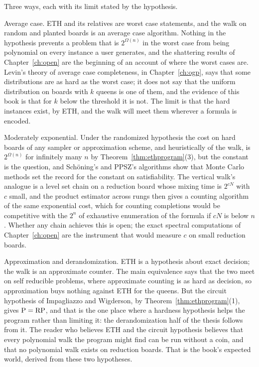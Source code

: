 Three ways, each with its limit stated by the hypothesis.

Average case. ETH and its relatives are worst case statements, and the walk on random and planted boards is an average case algorithm. Nothing in the hypothesis prevents a problem that is $2^{\Omega(n)}$ in the worst case from being polynomial on every instance a user generates, and the shattering results of Chapter~\ref{ch:open} are the beginning of an account of where the worst cases are. Levin's theory of average case completeness, in Chapter~\ref{ch:ogp}, says that some distributions are as hard as the worst case; it does not say that the uniform distribution on boards with $k$ queens is one of them, and the evidence of this book is that for $k$ below the threshold it is not. The limit is that the hard instances exist, by ETH, and the walk will meet them wherever a formula is encoded.

Moderately exponential. Under the randomized hypothesis the cost on hard boards of any sampler or approximation scheme, and heuristically of the walk, is $2^{\Omega(n)}$ for infinitely many $n$ by Theorem~\ref{thm:ethprogram}(3), but the constant is the question, and Sch\"oning's and PPSZ's algorithms show that Monte Carlo methods set the record for the constant on satisfiability. The vertical walk's analogue is a level set chain on a reduction board whose mixing time is $2^{cN}$ with $c$ small, and the product estimator across rungs then gives a counting algorithm of the same exponential cost, which for counting completions would be competitive with the $2^{n}$ of exhaustive enumeration of the formula if $c N$ is below $n$. Whether any chain achieves this is open; the exact spectral computations of Chapter~\ref{ch:open} are the instrument that would measure $c$ on small reduction boards.

Approximation and derandomization. ETH is a hypothesis about exact decision; the walk is an approximate counter. The main equivalence says that the two meet on self reducible problems, where approximate counting is as hard as decision, so approximation buys nothing against ETH for the queens. But the circuit hypothesis of Impagliazzo and Wigderson, by Theorem~\ref{thm:ethprogram}(1), gives $\mathrm{P} = \mathrm{RP}$, and that is the one place where a hardness hypothesis helps the program rather than limiting it: the derandomization half of the thesis follows from it. The reader who believes ETH and the circuit hypothesis believes that every polynomial walk the program might find can be run without a coin, and that no polynomial walk exists on reduction boards. That is the book's expected world, derived from these two hypotheses.

